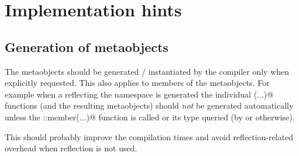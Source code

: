 \section{Implementation hints}
\label{section-impl-hints}

\subsection{Generation of metaobjects}

The metaobjects should be generated / instantiated by the compiler only
when explicitly requested. This also applies to members of the metaobjects. For example when a {}
reflecting the \verb@std@ namespace is generated the individual \verb@member(...)@
functions (and the resulting metaobjects) should {\em not} be generated automatically
unless the \verb@Scope::member(...)@ function is called or its type queried (by \verb@decltype@
or otherwise).

This should probably improve the compilation times and avoid reflection-related
overhead when reflection is not used.

